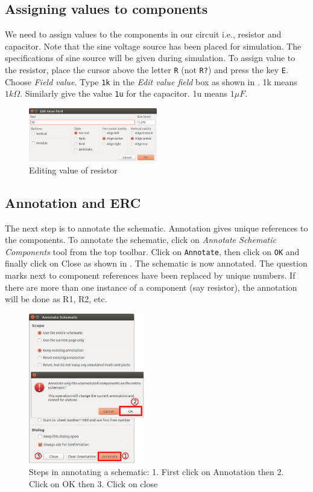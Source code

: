 \subsection{Assigning values to components}
We need to assign values to the components in our circuit i.e.,
resistor and capacitor. Note that the sine voltage source has been
placed for simulation. The specifications of sine source will be given
during simulation. 
To assign value to the resistor, place the cursor above the letter {\tt R}
(not {\tt R?}) and press the key {\tt E}. Choose \textit{Field
  value}. Type {\tt 1k} in the \textit{Edit value field} box as shown
in . 1k means $1k\Omega$. Similarly give the value
{\tt 1u} for the capacitor. 1u means $1\mu F$.  

\begin{figure}[h]
\centering
\includegraphics[width=0.5\textwidth]{manual_images/field.png}
\caption{Editing value of resistor}
\label{field}
\end{figure}

\subsection{Annotation and ERC}
\label{ann} 
The next step is to annotate the schematic. Annotation gives unique
references to the components. To annotate the schematic, click on
\textit{Annotate Schematic Components} tool from the top toolbar. Click on
{\tt Annotate}, then click on {\tt OK} and finally click on Close as shown in
. The schematic is now annotated. The question marks
next to component references have been replaced by unique numbers. If
there are more than one instance of a component (say resistor), the
annotation will be done as R1, R2, etc. 

\begin{figure}[h]
\centering
\includegraphics[width=0.45\textwidth]{manual_images/anno.png}
\caption{Steps in annotating a schematic: 1. First click on Annotation then 2. Click on OK then 3. Click on close}
\label{anno}
\end{figure}

